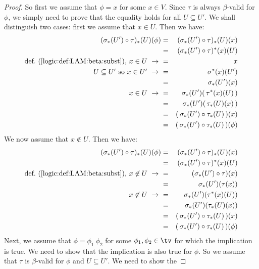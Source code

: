 \begin{proof}
    So first we assume that $\phi=x$ for some $x\in V$. Since $\tau$ is 
    always $\beta$-valid for $\phi$, we simply need to prove that the 
    equality holds for all $U\subseteq U'$. We shall distinguish two cases:
    first we assume that $x\in U$. Then we have:
        \begin{eqnarray*}(\sigma_{*}(U')\circ\tau)_{*}(U)(\phi)
            &=&(\sigma_{*}(U')\circ\tau)_{*}(U)(x)\\
            &=&(\sigma_{*}(U')\circ\tau)^{*}(x)(U)\\
            \mbox{def.~(\ref{logic:def:LAM:beta:subst}), $x\in U\ \to\ $}
            &=&x\\
            \mbox{$U\subseteq U'$ so $x\in U'\ \to\ $}
            &=&\sigma^{*}(x)(U')\\
            &=&\sigma_{*}(U')(x)\\
            \mbox{$x\in U\ \to\ $}
            &=&\sigma_{*}(U')(\,\tau^{*}(x)(U)\,)\\
            &=&\sigma_{*}(U')(\,\tau_{*}(U)(x)\,)\\
            &=&(\,\sigma_{*}(U')\circ \tau_{*}(U)\,)(x)\\
            &=&(\,\sigma_{*}(U')\circ \tau_{*}(U)\,)(\phi)
        \end{eqnarray*}
    We now assume that $x\not\in U$. Then we have:
        \begin{eqnarray*}(\sigma_{*}(U')\circ\tau)_{*}(U)(\phi)
            &=&(\sigma_{*}(U')\circ\tau)_{*}(U)(x)\\
            &=&(\sigma_{*}(U')\circ\tau)^{*}(x)(U)\\
            \mbox{def.~(\ref{logic:def:LAM:beta:subst}), $x\not\in U\ \to\ $}
            &=&(\sigma_{*}(U')\circ\tau)(x)\\
            &=&\sigma_{*}(U')(\tau(x))\\
            \mbox{$x\not\in U\ \to\ $}
            &=&\sigma_{*}(U')(\tau^{*}(x)(U))\\
            &=&\sigma_{*}(U')(\tau_{*}(U)(x))\\
            &=&(\,\sigma_{*}(U')\circ\tau_{*}(U)\,)(x)\\
            &=&(\,\sigma_{*}(U')\circ\tau_{*}(U)\,)(\phi)
        \end{eqnarray*}
    Next, we assume that $\phi=\phi_{1}\ \phi_{2}$ for some $\phi_{1},\phi_{2}
    \in\tv$ for which the implication is true. We need to show that the
    implication is also true for $\phi$. So we assume that $\tau$ is
    $\beta$-valid for $\phi$ and $U\subseteq U'$. We need to show the

\end{proof}
